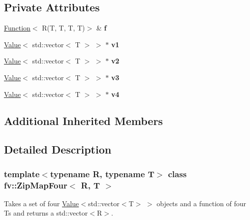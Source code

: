 \subsection*{Private Attributes}
\begin{DoxyCompactItemize}
\item 
\hypertarget{classfv_1_1ZipMapFour_ad64b5654f8c745900a1b6d8aa6b9b681}{}\label{classfv_1_1ZipMapFour_ad64b5654f8c745900a1b6d8aa6b9b681} 
\hyperlink{classfv_1_1Function}{Function}$<$ R(T, T, T, T)$>$ \& {\bfseries f}
\item 
\hypertarget{classfv_1_1ZipMapFour_ad1d5d707ed951de86236f4ccb7b4822a}{}\label{classfv_1_1ZipMapFour_ad1d5d707ed951de86236f4ccb7b4822a} 
\hyperlink{classfv_1_1Value}{Value}$<$ std\+::vector$<$ T $>$ $>$ $\ast$ {\bfseries v1}
\item 
\hypertarget{classfv_1_1ZipMapFour_a7372a10312b93e50e8851244caa82e14}{}\label{classfv_1_1ZipMapFour_a7372a10312b93e50e8851244caa82e14} 
\hyperlink{classfv_1_1Value}{Value}$<$ std\+::vector$<$ T $>$ $>$ $\ast$ {\bfseries v2}
\item 
\hypertarget{classfv_1_1ZipMapFour_aa403e20095880e9ae7f0853ca47a7166}{}\label{classfv_1_1ZipMapFour_aa403e20095880e9ae7f0853ca47a7166} 
\hyperlink{classfv_1_1Value}{Value}$<$ std\+::vector$<$ T $>$ $>$ $\ast$ {\bfseries v3}
\item 
\hypertarget{classfv_1_1ZipMapFour_a0e2fa2764e5c0023336a5d294fe53c00}{}\label{classfv_1_1ZipMapFour_a0e2fa2764e5c0023336a5d294fe53c00} 
\hyperlink{classfv_1_1Value}{Value}$<$ std\+::vector$<$ T $>$ $>$ $\ast$ {\bfseries v4}
\end{DoxyCompactItemize}
\subsection*{Additional Inherited Members}


\subsection{Detailed Description}
\subsubsection*{template$<$typename R, typename T$>$\newline
class fv\+::\+Zip\+Map\+Four$<$ R, T $>$}

Takes a set of four \hyperlink{classfv_1_1Value}{Value}$<$std\+::vector$<$\+T$>$ $>$ objects and a function of four Ts and returns a std\+::vector$<$\+R$>$. 

